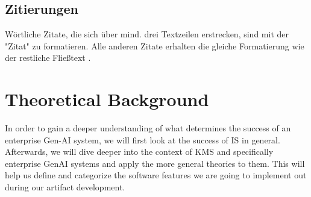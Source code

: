 \documentclass[
	english,
	ruledheaders=section,%
	class=report,%
	thesis={type=bachelor},%
	accentcolor=1b,%
	custommargins=true,%
	marginpar=false,%
	parskip=half-,%
	fontsize=11pt,%
	DIV=14,
]{tudapub}
\begin{document}
\section{Zitierungen}
Wörtliche Zitate, die sich über mind. drei Textzeilen erstrecken, sind mit der "Zitat" zu formatieren. Alle anderen Zitate erhalten die gleiche Formatierung wie der restliche Fließtext \parencite{buxmann2015softwareindustrie}.

\chapter{Theoretical Background}
In order to gain a deeper understanding of what determines the success of an enterprise Gen-AI system, we will first look at the success of IS in general. Afterwards, we will dive deeper into the context of KMS and specifically enterprise GenAI systems and apply the more general theories to them. This will help us define and categorize the software features we are going to implement out during our artifact development.
\end{document}
